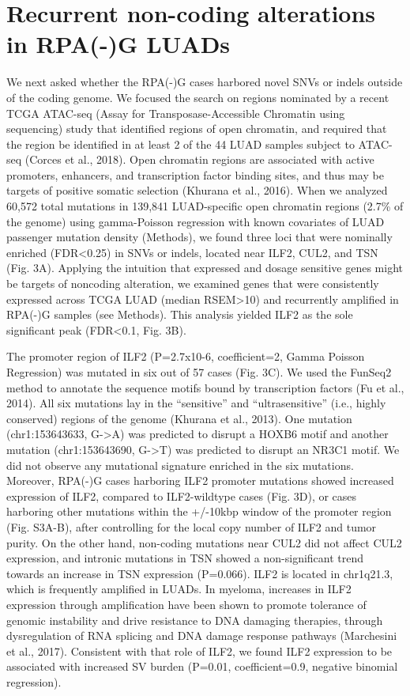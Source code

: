 \documentclass[phd,tocprelim]{cornell}
\begin{document}
\section{Recurrent non-coding alterations in RPA(-)G LUADs }

We next asked whether the RPA(-)G cases harbored novel SNVs or indels outside of the coding genome. We focused the search on regions nominated by a recent TCGA ATAC-seq (Assay for Transposase-Accessible Chromatin using sequencing) study that identified regions of open chromatin, and required that the region be identified in at least 2 of the 44 LUAD samples subject to ATAC-seq (Corces et al., 2018). Open chromatin regions are associated with active promoters, enhancers, and transcription factor binding sites, and thus may be targets of positive somatic selection (Khurana et al., 2016). When we analyzed 60,572 total mutations in 139,841 LUAD-specific open chromatin regions (2.7\% of the genome) using gamma-Poisson regression with known covariates of LUAD passenger mutation density (Methods), we found three loci that were nominally enriched (FDR<0.25) in SNVs or indels, located near ILF2, CUL2, and TSN (Fig. 3A). Applying the intuition that expressed and dosage sensitive genes might be targets of noncoding alteration, we examined genes that were consistently expressed across TCGA LUAD (median RSEM>10) and recurrently amplified in RPA(-)G samples (see Methods).  This analysis yielded ILF2 as the sole significant peak (FDR<0.1, Fig. 3B).  

The promoter region of ILF2 (P=2.7x10-6, coefficient=2, Gamma Poisson Regression) was mutated in six out of 57 cases (Fig. 3C). We used the FunSeq2 method to annotate the sequence motifs bound by transcription factors (Fu et al., 2014). All six mutations lay in the “sensitive” and “ultrasensitive” (i.e., highly conserved) regions of the genome (Khurana et al., 2013). One mutation (chr1:153643633, G->A) was predicted to disrupt a HOXB6 motif and another mutation (chr1:153643690, G->T) was predicted to disrupt an NR3C1 motif. We did not observe any mutational signature enriched in the six mutations. Moreover, RPA(-)G cases harboring ILF2 promoter mutations showed increased expression of ILF2, compared to ILF2-wildtype cases (Fig. 3D), or cases harboring other mutations within the +/-10kbp window of the promoter region (Fig. S3A-B), after controlling for the local copy number of ILF2 and tumor purity. On the other hand, non-coding mutations near CUL2 did not affect CUL2 expression, and intronic mutations in TSN showed a non-significant trend towards an increase in TSN expression (P=0.066). ILF2 is located in chr1q21.3, which is frequently amplified in LUADs. In myeloma, increases in ILF2 expression through amplification have been shown to promote tolerance of genomic instability and drive resistance to DNA damaging therapies, through dysregulation of RNA splicing and DNA damage response pathways (Marchesini et al., 2017). Consistent with that role of ILF2, we found ILF2 expression to be associated with increased SV burden (P=0.01, coefficient=0.9, negative binomial regression).     
\end{document}
